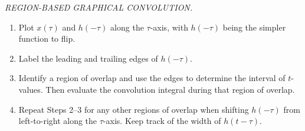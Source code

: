 \documentclass{report}
\begin{document}
\begin{tcolorbox}[width=\textwidth,colback={white}, sharp corners]
    \noindent\emph{REGION-BASED GRAPHICAL CONVOLUTION.}
    \begin{enumerate}[Step 1:]
        \item Plot $x(\tau)$ and $h(-\tau)$ along the $\tau$-axis, with $h(-\tau)$ being the simpler function to flip.
        \item Label the leading and trailing edges of $h(-\tau)$.
        \item Identify a region of overlap and use the edges to determine the interval of $t$-values. Then evaluate the convolution integral during that region of overlap. 
        \item Repeat Steps 2--3 for any other regions of overlap when shifting $h(-\tau)$ from left-to-right along the $\tau$-axis. Keep track of the width of $h(t-\tau)$. 
    \end{enumerate}
\end{tcolorbox}
\end{document}
